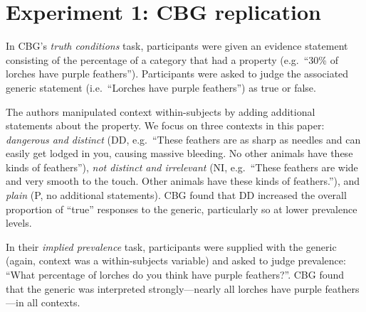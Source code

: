 \documentclass[10pt,letterpaper]{article}
\begin{document}


\section{Experiment 1: CBG replication}

In CBG's \emph{truth conditions} task, participants were given an evidence statement consisting of the percentage of a category that had a property (e.g.~``30\% of lorches have purple feathers''). Participants were asked to judge the associated generic statement (i.e.~``Lorches have purple feathers'') as true or false. 

The authors manipulated context within-subjects by adding additional statements about the property. We focus on three contexts in this paper: \emph{dangerous and distinct} (DD, e.g.~``These feathers are as sharp as needles and can easily get lodged in you, causing massive bleeding. No other animals have these kinds of feathers''), \emph{not distinct and irrelevant} (NI, e.g.~``These feathers are wide and very smooth to the touch. Other animals have these kinds of feathers.''), and \emph{plain} (P, no additional statements). CBG found that DD increased the overall proportion of ``true'' responses to the generic, particularly so at lower prevalence levels. 

In their \emph{implied prevalence} task, participants were supplied with the generic (again, context was a within-subjects variable) and asked to judge prevalence: ``What percentage of lorches do you think have purple feathers?''. CBG found that the generic was interpreted strongly---nearly all lorches have purple feathers---in all contexts. 
\end{document}
